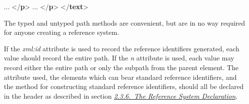 \begin{shaded}
\hspace*{1em}\hspace*{1em} ... {</\textbf{p}>}\mbox{}\newline 
\hspace*{1em}\hspace*{1em} ... {</\textbf{p}>}\mbox{}\newline 
\hspace*{1em}\mbox{}\newline 
{}\mbox{}\newline 
{</\textbf{text}>}\end{shaded}\egroup\par \noindent  The typed and untyped path methods are convenient, but are in no way required for anyone creating a reference system.\par
If the {\itshape xml:id} attribute is used to record the reference identifiers generated, each value should record the entire path. If the {\itshape n} attribute is used, each value may record either the entire path or only the subpath from the parent element. The attribute used, the elements which can bear standard reference identifiers, and the method for constructing standard reference identifiers, should all be declared in the header as described in section \textit{\hyperref[HD54]{2.3.6.\ The Reference System Declaration}}.

